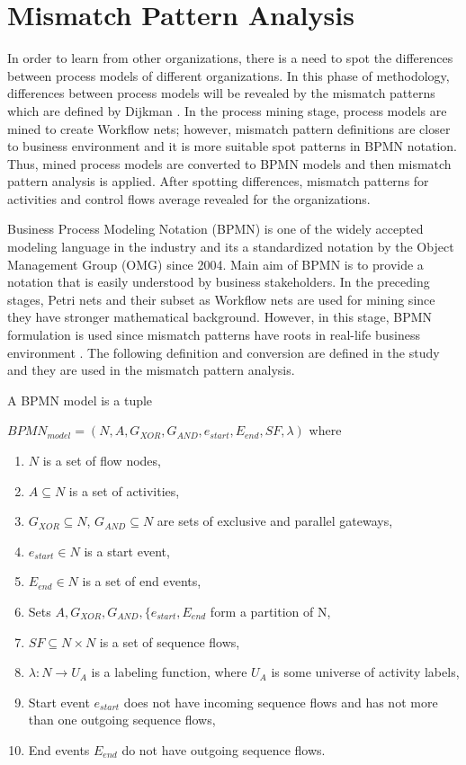 \section{Mismatch Pattern Analysis}
\label{sec:mismatch-pattern-analysis}
In order to learn from other organizations, there is a need to spot the differences between process models of different organizations. In this phase of methodology, differences between process models will be revealed by the mismatch patterns which are defined by Dijkman \cite{dijkman2007mismatch}. In the process mining stage, process models are mined to create Workflow nets; however, mismatch pattern definitions are closer to business environment and it is more suitable spot patterns in BPMN notation. Thus, mined process models are converted to BPMN models and then mismatch pattern analysis is applied. After spotting differences, mismatch patterns for activities and control flows average revealed for the organizations.

Business Process Modeling Notation (BPMN) is one of the widely accepted modeling language in the industry and its a standardized notation by the Object Management Group (OMG) since 2004. Main aim of BPMN is to provide a notation that is easily understood by business stakeholders. In the preceding stages, Petri nets and their subset as Workflow nets are used for mining since they have stronger mathematical background. However, in this stage, BPMN formulation is used since mismatch patterns have roots in real-life business environment \cite{dijkman2007mismatch}. The following definition and conversion are defined in the study \cite{kalenkovaprocess} and they are used in the mismatch pattern analysis. 

\theoremstyle{definition}
\begin{definition}
A BPMN model is a tuple 

$BPMN_{model}=(N, A, G_{XOR}, G_{AND}, e_{start}, E_{end}, SF, \lambda)$ where
\begin{enumerate}
  \item $N$ is a set of flow nodes,
  \item $A \subseteq N$ is a set of activities,
  \item $G_{XOR} \subseteq N$, $G_{AND} \subseteq N$ are sets of exclusive and parallel gateways,
  \item $e_{start} \in N$ is a start event,
  \item $E_{end} \in N$ is a set of end events,
  \item Sets $A, G_{XOR}, G_{AND}, \{e_{start}, E_{end}$ form a partition of N,
  \item $SF \subseteq N \times N$ is a set of sequence flows,
  \item $\lambda : N \rightarrow U_{A}$ is a labeling function, where $U_{A}$ is some universe of activity labels,
  \item Start event $e_{start}$ does not have incoming sequence flows and has not more than one outgoing sequence flows,
  \item End events $E_{end}$ do not have outgoing sequence flows.  
\end{enumerate}
\end{definition}

